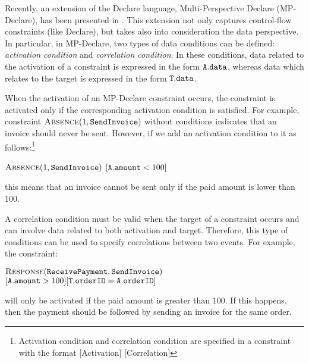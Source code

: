 



Recently, an extension of the Declare language, Multi-Perspective Declare (MP-Declare), has been presented in \cite{DBLP:journals/eswa/BurattinMS16}. This extension not only captures control-flow constraints (like Declare), but takes also into consideration the data perspective. In particular, in MP-Declare, two types of data conditions can be defined: \emph{activation condition} and \emph{correlation condition}. In these conditions, data related to the activation of a constraint is expressed in the form $\mathtt{A.data}$, whereas data which relates to the target is expressed in the form $\mathtt{T.data}$.

When the activation of an MP-Declare constraint occurs, the constraint is activated only if the corresponding activation condition is satisfied. For example, constraint $\textsc{Absence}(1,\mathtt{SendInvoice})$ without conditions indicates that an invoice should never be sent. However, if we add an activation condition to it as follows:\footnote{Activation condition and correlation condition are  specified in a constraint with the format [Activation] [Correlation]}
\begin{center}
	$\textsc{Absence}(1,\mathtt{SendInvoice})$ $[\mathtt{A.amount} < 100]$
\end{center}
this means that an invoice cannot be sent only if the paid amount is lower than 100.


A correlation condition must be valid when the target of a constraint occurs and can involve data related to both activation and target. Therefore, this type of conditions can be used to specify correlations between two events. For example, the constraint:
\begin{center}
	$\textsc{Response}(\mathtt{ReceivePayment},\mathtt{SendInvoice})$ \\
	$[\mathtt{A.amount} > 100][\mathtt{T.orderID} = \mathtt{A.orderID}]$
\end{center}
will only be activated if the paid amount is greater than 100. If this happens, then the payment should be followed by sending an invoice for the same order.




